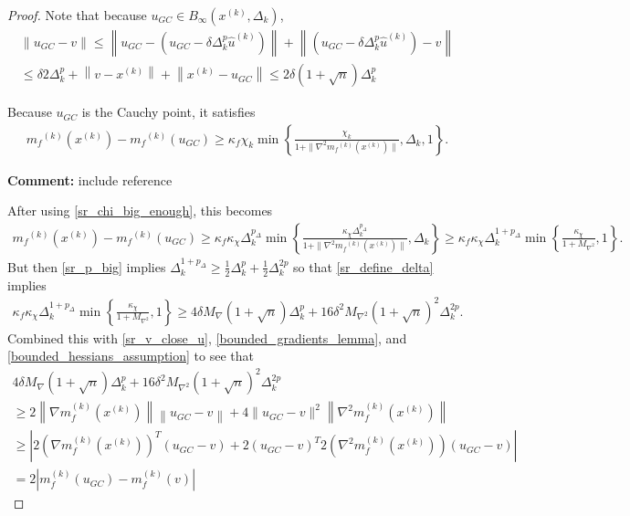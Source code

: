 \documentclass{article}
\newenvironment{comment}
  {\par\medskip
   \color{red}%
   \begin{framed}
   \textbf{Comment: }\ignorespaces}
 {\end{framed}
  \medskip}
\theoremstyle{case}
\newcommand{\dk}{\Delta_k}
\newcommand{\gk}{{\nabla m_f^{(k)}(x^{(k)})}}
\newcommand{\huk}{{{\hat u}^{(k)}}}
\newcommand{\maxgrad}{{M_{\nabla}}}
\newcommand{\maxhessian}{{M_{\nabla^2}}}
\newcommand{\mfk}{{{m}_f}^{(k)}}
\newcommand{\tr}{{ B_{\infty}\left(\xk, \dk\right) }}
\newcommand{\xk}{{x^{(k)}}}
\begin{document}
\begin{proof}
Note that because $u_{GC} \in \tr$, 
\begin{align}
\|u_{GC} - v\| \le \left\|u_{GC} - \left(u_{GC} - \delta \dk^{p} \huk\right)\right\| + \left\|\left(u_{GC} - \delta \dk^{p} \huk\right) - v\right\| \nonumber \\
\le \delta 2\dk^{p} + \left\|v - \xk \right\| + \left\|\xk - u_{GC}\right\|
\le 2 \delta\left(1 + \sqrt{n}\right) \dk^{p} \label{sr_v_close_u}
\end{align}

Because $u_{GC}$ is the Cauchy point, it satisfies
\begin{align*}
\mfk(\xk) - \mfk(u_{GC}) \ge \kappa_f \chi_k \min\left\{ \frac{\chi_k}{1+\|\nabla^2 \mfk(\xk)\|}, \dk, 1 \right\}.
\end{align*}
\begin{comment}
include reference
\end{comment}
After using \cref{sr_chi_big_enough}, this becomes
\begin{align*}
\mfk(\xk) - \mfk(u_{GC})
\ge \kappa_f \kappa_{\chi} \dk^{p_{\Delta}} \min\left\{ \frac{\kappa_{\chi} \dk^{p_{\Delta}}}{1+\|\nabla^2 \mfk(\xk)\|}, \dk \right\}
\ge \kappa_f \kappa_{\chi} \dk^{1 + p_{\Delta}} \min\left\{ \frac{\kappa_{\chi}}{1 + \maxhessian}, 1 \right\}.
\end{align*}
But then \cref{sr_p_big} implies $\dk^{1+p_{\Delta}} \ge \frac 1 2 \dk^p + \frac 1 2 \dk^{2p}$
so that \cref{sr_define_delta} implies
\begin{align*}
\kappa_f \kappa_{\chi} \dk^{1 + p_{\Delta}} \min\left\{ \frac{\kappa_{\chi}}{1 + \maxhessian}, 1 \right\} 
\ge 4\delta\maxgrad \left(1 + \sqrt{n}\right) \dk^{p} + 16\delta^2 \maxhessian\left(1 + \sqrt{n}\right)^2\dk^{2p}.
\end{align*}
Combined this with \cref{sr_v_close_u}, \cref{bounded_gradients_lemma}, and \cref{bounded_hessians_assumption} to see that
\begin{align*}
4\delta\maxgrad \left(1 + \sqrt{n}\right) \dk^{p} + 16\delta^2 \maxhessian\left(1 + \sqrt{n}\right)^2\dk^{2p} \\
\ge 2\left\|\gk\right \|  \left\|u_{GC}- v\right\| + 4 \|u_{GC} - v\|^2 \left\|\nabla^2m_f^{(k)}\left(\xk\right)\right\| \\
\ge \left|2\left(\gk\right)^T(u_{GC} - v) + 2\left(u_{GC} - v\right) ^T 2\left(\nabla^2m_f^{(k)}\left(\xk\right)\right)\left(u_{GC} - v\right) \right|\\
= 2 \left|m_f^{(k)}(u_{GC}) - m_f^{(k)}(v)\right|
\end{align*}

\end{proof}
\end{document}
